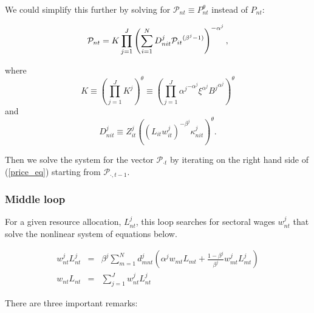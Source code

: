 \documentclass[12pt]{article}
\begin{document}
We could simplify this further by solving for $\mathcal{P}_{nt} \equiv
P_{nt}^{\theta}$ instead of $P_{nt}$:

\begin{equation}
\mathcal{P}_{nt} = K \prod_{j = 1}^J \left(\sum_{i = 1}^N D_{nit}^j {%
\mathcal{P}_{it}}^{(\beta^j - 1)}\right)^{-\alpha^j},  \label{price_eq}
\end{equation}

where 
\begin{equation*}
K \equiv \left(\prod_{j = 1}^J K^j\right)^\theta \equiv \left(\prod_{j =
1}^J {\alpha^j}^{- \alpha^j} \xi^{\alpha^j} {B^j}^{\alpha^j} \right)^\theta
\end{equation*}
and 
\begin{equation*}
D_{nit}^j \equiv Z_{it}^j {\left((L_{it}w_{it}^j)^{- \beta^j}
\kappa_{nit}^j\right)}^{\theta}.
\end{equation*}

Then we solve the system for the vector $\mathcal{P}_{\cdot t}$ by iterating
on the right hand side of (\ref{price_eq}) starting from $\mathcal{P}_{\cdot
,t-1}$.

\subsubsection{Middle loop}

For a given resource allocation, $L_{nt}^j$, this loop searches for sectoral
wages $w_{nt}^j$ that solve the nonlinear system of equations below.

\begin{eqnarray}
w_{nt}^j L_{nt}^j &=& \beta^j \sum_{m = 1}^N d_{mnt}^j \left( \alpha^j
w_{mt} L_{mt} + \frac{1 - \beta^j}{\beta^j} w_{mt}^j L_{mt}^j\right) \\
w_{nt} L_{nt} &=& \sum_{j = 1}^J w_{nt}^j L_{nt}^j
\end{eqnarray}

There are three important remarks:
\end{document}
